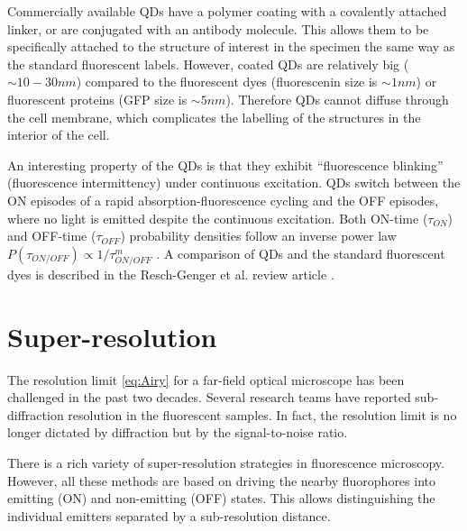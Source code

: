Commercially available QDs have a polymer coating with a covalently attached linker, or are conjugated with an antibody molecule. This allows them to be specifically attached to the structure of interest in the specimen the same way as the standard fluorescent labels. However, coated QDs are relatively big ($\sim10-30\unit{nm}$) compared to the fluorescent dyes (fluorescenin size is $\sim1\unit{nm}$) or fluorescent proteins (GFP size is $\sim5\unit{nm}$). Therefore QDs cannot diffuse through the cell membrane, which complicates the labelling of the structures in the interior of the cell. 

An interesting property of the QDs is that they exhibit ``fluorescence blinking'' (fluorescence intermittency) under continuous excitation. QDs switch between the ON episodes of a rapid absorption-fluorescence cycling and the OFF episodes, where no light is emitted despite the continuous excitation. Both ON-time ($\tau_{ON}$) and OFF-time ($\tau_{OFF}$) probability densities follow an inverse power law $P(\tau_{ON/OFF})\propto1/\tau_{ON/OFF}^{m}$ \cite{Kuno2001, Stefani2009}. A comparison of QDs and the standard fluorescent dyes is described in the Resch-Genger et al. review article \cite{Resch-Genger2008}.


\section{Super-resolution\label{sec:super-resolution}}

The resolution limit \autoref{eq:Airy} for a far-field optical microscope has been challenged in the past two decades. Several research teams have reported sub-diffraction resolution in the fluorescent samples. In fact, the resolution limit is no longer dictated by diffraction but by the signal-to-noise ratio. 

There is a rich variety of super-resolution strategies in fluorescence microscopy. However, all these methods are based on driving the nearby fluorophores into emitting (ON) and non-emitting (OFF) states. This allows distinguishing the individual emitters separated by a sub-resolution distance.

